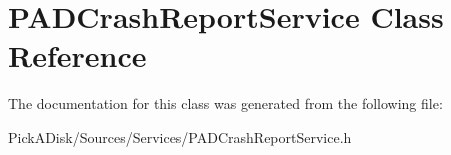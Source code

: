 \hypertarget{interface_p_a_d_crash_report_service}{
\section{PADCrashReportService Class Reference}
\label{interface_p_a_d_crash_report_service}
}


The documentation for this class was generated from the following file:\begin{DoxyCompactItemize}
\item 
PickADisk/Sources/Services/PADCrashReportService.h\end{DoxyCompactItemize}
